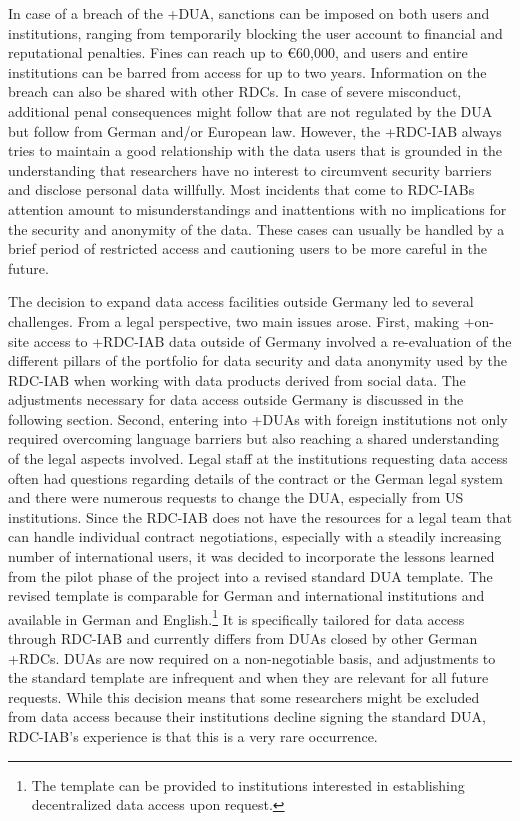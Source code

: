 \documentclass[
]{book}
\begin{document}
In case of a breach of the +DUA\textbar, sanctions can be imposed on both users and institutions, ranging from temporarily blocking the user account to financial and reputational penalties. Fines can reach up to €60,000, and users and entire institutions can be barred from access for up to two years. Information on the breach can also be shared with other RDCs. In case of severe misconduct, additional penal consequences might follow that are not regulated by the DUA but follow from German and/or European law. However, the +RDC-IAB\textbar{} always tries to maintain a good relationship with the data users that is grounded in the understanding that researchers have no interest to circumvent security barriers and disclose personal data willfully. Most incidents that come to RDC-IABs attention amount to misunderstandings and inattentions with no implications for the security and anonymity of the data. These cases can usually be handled by a brief period of restricted access and cautioning users to be more careful in the future.

The decision to expand data access facilities outside Germany led to several challenges. From a legal perspective, two main issues arose. First, making +on-site\textbar{} access to +RDC-IAB\textbar{} data outside of Germany involved a re-evaluation of the different pillars of the portfolio for data security and data anonymity used by the RDC-IAB when working with data products derived from social data. The adjustments necessary for data access outside Germany is discussed in the following section. Second, entering into +DUA\textbar s with foreign institutions not only required overcoming language barriers but also reaching a shared understanding of the legal aspects involved. Legal staff at the institutions requesting data access often had questions regarding details of the contract or the German legal system and there were numerous requests to change the DUA, especially from US institutions. Since the RDC-IAB does not have the resources for a legal team that can handle individual contract negotiations, especially with a steadily increasing number of international users, it was decided to incorporate the lessons learned from the pilot phase of the project into a revised standard DUA template. The revised template is comparable for German and international institutions and available in German and English.\footnote{The template can be provided to institutions interested in establishing decentralized data access upon request.} It is specifically tailored for data access through RDC-IAB and currently differs from DUAs closed by other German +RDC\textbar s. DUAs are now required on a non-negotiable basis, and adjustments to the standard template are infrequent and when they are relevant for all future requests. While this decision means that some researchers might be excluded from data access because their institutions decline signing the standard DUA, RDC-IAB's experience is that this is a very rare occurrence.
\end{document}
